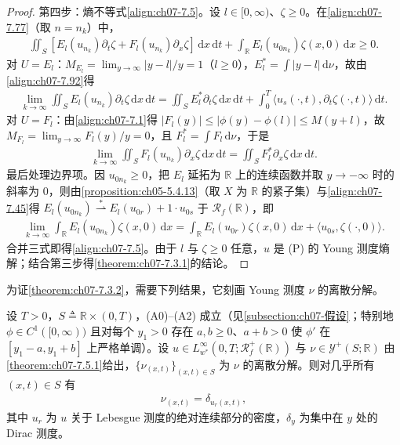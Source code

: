 \documentclass[../../main.tex]{subfiles}%
\begin{document}
\begin{proof}
第四步：熵不等式\eqref{align:ch07-7.5}。设 $l\in[0,\infty)$、$\zeta\geqslant0$。在\eqref{align:ch07-7.77}（取 $n=n_k$）中，
\begin{align*}
\iint_S[E_l(u_{n_k})\partial_t\zeta+F_l(u_{n_k})\partial_x\zeta]\,\mathrm{d}x\,\mathrm{d}t+\int_{\mathbb{R}}E_l(u_{0n_k})\zeta(x,0)\,\mathrm{d}x\geqslant0.
\end{align*}
对 $U=E_l$：$M_{E_l}=\lim_{y\to\infty}|y-l|/y=1$（$l\geqslant0$），$E_l^*=\int|y-l|\,\mathrm{d}\nu$，故由\eqref{align:ch07-7.92}得
\begin{align*}
\lim_{k\to\infty}\iint_SE_l(u_{n_k})\partial_t\zeta\,\mathrm{d}x\,\mathrm{d}t
=\iint_SE_l^*\partial_t\zeta\,\mathrm{d}x\,\mathrm{d}t+\int_0^T\langle u_s(\cdot,t),\partial_t\zeta(\cdot,t)\rangle\,\mathrm{d}t.
\end{align*}
对 $U=F_l$：由\eqref{align:ch07-7.1}得 $|F_l(y)|\leqslant|\phi(y)-\phi(l)|\leqslant M(y+l)$，故 $M_{F_l}=\lim_{y\to\infty}F_l(y)/y=0$，且 $F_l^*=\int F_l\,\mathrm{d}\nu$，于是
\begin{align*}
\lim_{k\to\infty}\iint_SF_l(u_{n_k})\partial_x\zeta\,\mathrm{d}x\,\mathrm{d}t=\iint_SF_l^*\partial_x\zeta\,\mathrm{d}x\,\mathrm{d}t.
\end{align*}
最后处理边界项。因 $u_{0n_k}\geqslant0$，把 $E_l$ 延拓为 $\mathbb{R}$ 上的连续函数并取 $y\to-\infty$ 时的斜率为 $0$，则由\cref{proposition:ch05-5.4.13}（取 $X$ 为 $\mathbb{R}$ 的紧子集）与\eqref{align:ch07-7.45}得 $E_l(u_{0n_k})\stackrel{*}{\rightharpoonup}E_l(u_{0r})+1\cdot u_{0s}$ 于 $\mathscr{R}_f(\mathbb{R})$，即
\begin{align*}
\lim_{k\to\infty}\int_{\mathbb{R}}E_l(u_{0n_k})\zeta(x,0)\,\mathrm{d}x=\int_{\mathbb{R}}E_l(u_{0r})\zeta(x,0)\,\mathrm{d}x+\langle u_{0s},\zeta(\cdot,0)\rangle.
\end{align*}
合并三式即得\eqref{align:ch07-7.5}。由于 $l$ 与 $\zeta\geqslant0$ 任意，$u$ 是 (P) 的 Young 测度熵解；结合第三步得\cref{theorem:ch07-7.3.1}的结论。
\end{proof}

为证\cref{theorem:ch07-7.3.2}，需要下列结果，它刻画 Young 测度 $\nu$ 的离散分解。

\begin{proposition}\label{proposition:ch07-7.5.7}
设 $T>0$，$S\triangleq\mathbb{R}\times(0,T)$，(A0)--(A2) 成立（见\cref{subsection:ch07-假设}；特别地 $\phi\in C^1([0,\infty))$ 且对每个 $y_1>0$ 存在 $a,b\geqslant0$、$a+b>0$ 使 $\phi'$ 在 $[y_1-a,y_1+b]$ 上严格单调）。设 $u\in L^\infty_{w^*}(0,T;\mathscr{R}_f^+(\mathbb{R}))$ 与 $\nu\in\mathcal{Y}^+(S;\mathbb{R})$ 由\cref{theorem:ch07-7.5.1}给出，$\{\nu_{(x,t)}\}_{(x,t)\in S}$ 为 $\nu$ 的离散分解。则对几乎所有 $(x,t)\in S$ 有
\begin{align}
\nu_{(x,t)}=\delta_{u_r(x,t)}, \label{align:ch07-7.139}
\end{align}
其中 $u_r$ 为 $u$ 关于 Lebesgue 测度的绝对连续部分的密度，$\delta_{y}$ 为集中在 $y$ 处的 Dirac 测度。
\end{proposition}
\end{document}

